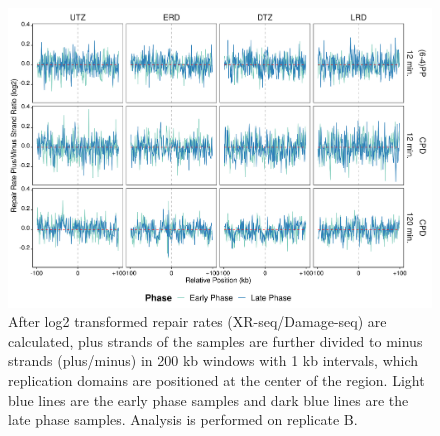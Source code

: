 \begin{figure}[H]
\begin{center}
\includegraphics[width=\textwidth]{Chapters/7_appendix/figures/supfig33}
\caption[Repair rate plus/minus phase ratio of replication domains in 200 kb (replicate B).]{After log2 transformed repair rates (XR-seq/Damage-seq) are calculated, plus strands of the samples are further divided to minus strands (plus/minus) in 200 kb windows with 1 kb intervals, which replication domains are positioned at the center of the region. Light blue lines are the early phase samples and dark blue lines are the late phase samples. Analysis is performed on replicate B.}
\label{supfig:rrpm200repdomainB}
\end{center}
\end{figure}

